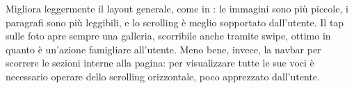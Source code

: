 Migliora leggermente il layout generale, come in : le immagini sono più piccole, i paragrafi sono più leggibili, e lo scrolling è meglio sopportato dall'utente. Il tap sulle foto apre sempre una galleria, scorribile anche tramite swipe, ottimo in quanto è un'azione famigliare all'utente. Meno bene, invece, la navbar per scorrere le sezioni interne alla pagina: per visualizzare tutte le sue voci è necessario operare dello scrolling orizzontale, poco apprezzato dall'utente. 